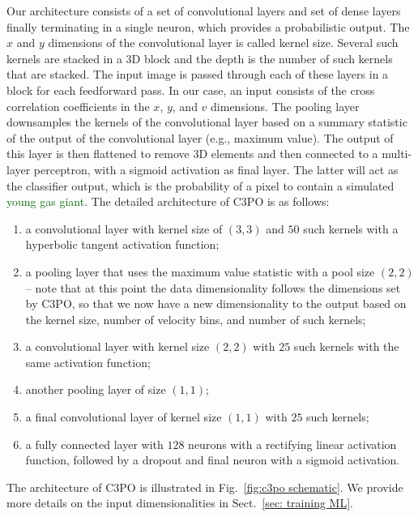 \documentclass{aa}
\newcommand{\newchange}[1]{\textcolor{darkgreen}{#1}}
\begin{document}
Our architecture consists of a set of convolutional layers and set of dense layers finally terminating in a single neuron, which provides a probabilistic output.
The $x$ and $y$ dimensions of the convolutional layer is called kernel size.
Several such kernels are stacked in a 3D block and the depth is the number of such kernels that are stacked.
The input image is passed through each of these layers in a block for each feedforward pass.
In our case, an input consists of the cross correlation coefficients in the $x$, $y$, and $v$ dimensions.
The pooling layer downsamples the kernels of the convolutional layer based on a summary statistic of the output of the convolutional layer (e.g., maximum value).
The output of this layer is then flattened to remove 3D elements and then connected to a multi-layer perceptron, with a sigmoid activation as final layer. 
The latter will act as the classifier output, which is the probability of a pixel to contain a simulated \newchange{young gas giant}. The detailed architecture of C3PO is as follows:
\begin{enumerate}
    \item a convolutional layer with kernel size of $\left(3,3\right)$ and $50$ such kernels with a hyperbolic tangent activation function;
    \item a pooling layer that uses the maximum value statistic with a pool size $\left(2,2\right)$ -- note that at this point the data dimensionality follows the dimensions set by C3PO, so that we now have a new dimensionality to the output based on the kernel size, number of velocity bins, and number of such kernels;
    \item a convolutional layer with kernel size $\left(2,2\right)$ with $25$ such kernels with the same activation function;
    \item another pooling layer of size $(1,1)$;
    \item a final convolutional layer of kernel size $(1,1)$ with $25$ such kernels;
    \item a fully connected layer with $128$ neurons with a rectifying linear activation function, followed by a dropout and final neuron with a sigmoid activation.
\end{enumerate}
The architecture of C3PO is illustrated in Fig.~\ref{fig:c3po schematic}. We provide more details on the input dimensionalities in Sect.~\ref{sec: training ML}.
\end{document}
